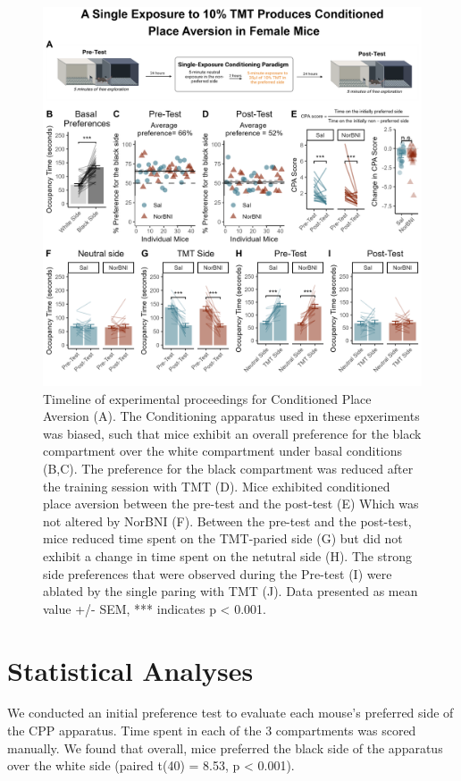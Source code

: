\documentclass[
]{book}
\begin{document}
\begin{figure}
\includegraphics[width=33.33in]{Panels/CPA_panel} \caption{Timeline of experimental proceedings for Conditioned Place Aversion (A). The Conditioning apparatus used in these epxeriments was biased, such that mice exhibit an overall preference for the black compartment over the white compartment under basal conditions (B,C). The preference for the black compartment was reduced after the training session with TMT (D). Mice exhibited conditioned place aversion between the pre-test and the post-test (E) Which was not altered by NorBNI (F). Between the pre-test and the post-test, mice reduced time spent on the TMT-paried side (G) but did not exhibit a change in time spent on the netutral side (H). The strong side preferences that were observed during the Pre-test (I) were ablated by the single paring with TMT (J). Data presented as mean value +/- SEM, *** indicates p < 0.001.}\label{fig:unnamed-chunk-29}
\end{figure}

\hypertarget{statistical-analyses-1}{%
\section{Statistical Analyses}\label{statistical-analyses-1}}

We conducted an initial preference test to evaluate each mouse's preferred side of the CPP apparatus. Time spent in each of the 3 compartments was scored manually. We found that overall, mice preferred the black side of the apparatus over the white side (paired t(40) = 8.53, p \textless{} 0.001).
\end{document}
